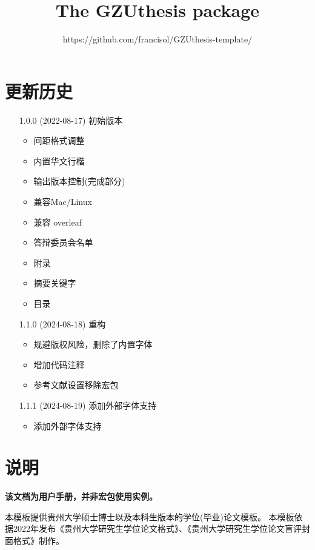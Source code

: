 \documentclass{ctxdoc}
\begin{document}
    \title{The \textsf{GZUthesis} package}
    \author{https://github.com/francisol/GZUthesis-template/}
    \maketitle

    \section*{更新历史}

    \begin{itemize}
        \item[1.0.0] (2022-08-17) 初始版本
        \begin{itemize}
            \item 间距格式调整
            \item 内置华文行楷
            \item 输出版本控制(完成部分)
            \item 兼容Mac/Linux
            \item 兼容 overleaf
            \item 答辩委员会名单
            \item 附录
            \item 摘要关键字
            \item 目录
        \end{itemize}

        \item[1.1.0] (2024-08-18) 重构
        \begin{itemize}
            \item 规避版权风险，删除了内置字体
            \item 增加代码注释
            \item 参考文献设置移除宏包
        \end{itemize}
        \item[1.1.1] (2024-08-19) 添加外部字体支持
        \begin{itemize}
            \item 添加外部字体支持
        \end{itemize}
    \end{itemize}


    \section{说明}
    \textbf{该文档为用户手册，并非宏包使用实例。}


    本模板提供贵州大学硕士博士\sout{以及本科生版本的}学位(毕业)论文模板。
    本模板依据2022年发布《贵州大学研究生学位论文格式》、《贵州大学研究生学位论文盲评封面格式》制作。
\end{document}
